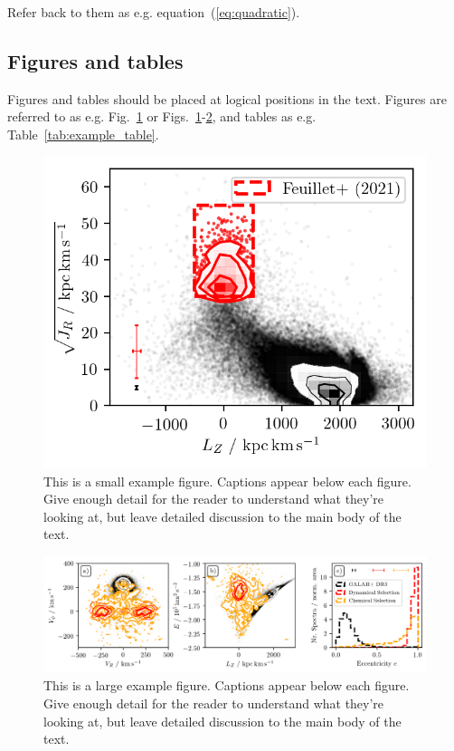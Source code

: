 \documentclass[fleqn,usenatbib]{mnras}
\begin{document}
Refer back to them as e.g. equation~(\ref{eq:quadratic}).

\subsection{Figures and tables}

Figures and tables should be placed at logical positions in the text. Figures are referred to as e.g. Fig.~\ref{fig:example_figure_small} or Figs.~\ref{fig:example_figure_small}-\ref{fig:example_figure_large}, and tables as e.g. Table~\ref{tab:example_table}.

\begin{figure}
	\includegraphics[width=\columnwidth]{figures/placeholder_columnwidth.png}
    \caption{This is a small example figure. Captions appear below each figure.
	Give enough detail for the reader to understand what they're looking at,
	but leave detailed discussion to the main body of the text.}
    \label{fig:example_figure_small}
\end{figure}

\begin{figure}
	\includegraphics[width=\textwidth]{figures/placeholder_textwidth.png}
    \caption{This is a large example figure. Captions appear below each figure.
	Give enough detail for the reader to understand what they're looking at,
	but leave detailed discussion to the main body of the text.}
    \label{fig:example_figure_large}
\end{figure}
\end{document}
